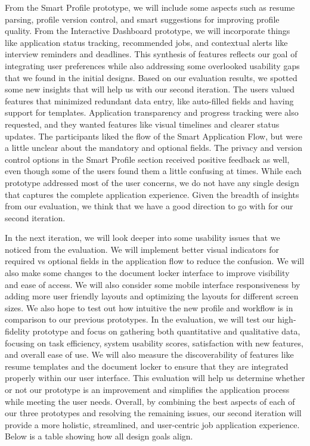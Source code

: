 \documentclass[
	letterpaper, %
]{jdf}
\begin{document}
\begin{sloppypar}
From the Smart Profile prototype, we will include some aspects such as resume parsing, profile version control, and smart suggestions for improving profile quality. From the Interactive Dashboard prototype, we will incorporate things like application status tracking, recommended jobs, and contextual alerts like interview reminders and deadlines. This synthesis of features reflects our goal of integrating user preferences while also addressing some overlooked usability gaps that we found in the initial designs. Based on our evaluation results, we spotted some new insights that will help us with our second iteration. The users valued features that minimized redundant data entry, like auto-filled fields and having support for templates. Application transparency and progress tracking were also requested, and they wanted features like visual timelines and clearer status updates. The participants liked the flow of the Smart Application Flow, but were a little unclear about the mandatory and optional fields. The privacy and version control options in the Smart Profile section received positive feedback as well, even though some of the users found them a little confusing at times. While each prototype addressed most of the user concerns, we do not have any single design that captures the complete application experience. Given the breadth of insights from our evaluation, we think that we have a good direction to go with for our second iteration.

In the next iteration, we will look deeper into some usability issues that we noticed from the evaluation. We will implement better visual indicators for required vs optional fields in the application flow to reduce the confusion. We will also make some changes to the document locker interface to improve visibility and ease of access. We will also consider some mobile interface responsiveness by adding more user friendly layouts and optimizing the layouts for different screen sizes. We also hope to test out how intuitive the new profile and workflow is in comparison to our previous prototypes. In the evaluation, we will test our high-fidelity prototype and focus on gathering both quantitative and qualitative data, focusing on task efficiency, system usability scores, satisfaction with new features, and overall ease of use. We will also measure the discoverability of features like resume templates and the document locker to ensure that they are integrated properly within our user interface. This evaluation will help us determine whether or not our prototype is an improvement and simplifies the application process while meeting the user needs. Overall, by combining the best aspects of each of our three prototypes and resolving the remaining issues, our second iteration will provide a more holistic, streamlined, and user-centric job application experience. Below is a table showing how all design goals align.


\end{sloppypar}
\end{document}
